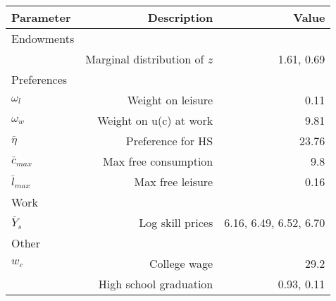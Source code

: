 \begin{tabular}{lrr}
\hline
Parameter & Description  & Value  \\ 
\hline
Endowments &   &   \\ 
 & Marginal distribution of $z$  & 1.61, 0.69  \\ 
Preferences &   &   \\ 
$\omega_{l}$ & Weight on leisure  & 0.11  \\ 
$\omega_{w}$ & Weight on u(c) at work  & 9.81  \\ 
$\bar{\eta}$ & Preference for HS  & 23.76  \\ 
$\bar{c}_{max}$ & Max free consumption  & 9.8  \\ 
$\bar{l}_{max}$ & Max free leisure  & 0.16  \\ 
Work &   &   \\ 
$\bar{Y}_{s}$ & Log skill prices  & 6.16, 6.49, 6.52, 6.70  \\ 
Other &   &   \\ 
$w_{c}$ & College wage  & 29.2  \\ 
 & High school graduation  & 0.93, 0.11  \\ 
\hline
\end{tabular}%
